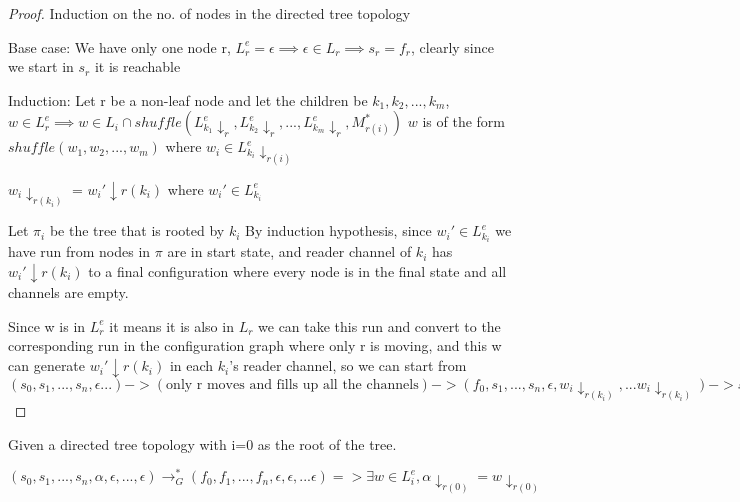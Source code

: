 \documentclass[a4paper,UKenglish,cleveref, autoref, thm-restate]{lipics-v2019}
\begin{document}
   
\begin{proof}
Induction on the no. of nodes in the directed tree topology

Base case: We have only one node r,  $L_r^e = {\epsilon} \implies \epsilon \in L_r \implies s_r = f_r$, clearly since we start in $s_r$ it is reachable

Induction: 
Let r be a non-leaf node and let the children be $k_1, k_2, ..., k_m$,  
$w \in L_r^e \implies w \in L_i \cap shuffle(L_{k_1}^e\!\!\!\downarrow_{r}, L_{k_2}^e\!\!\!\downarrow_{r}, ..., L_{k_m}^e\!\!\!\downarrow_{r}, M_{r(i)}^*)$
$w$ is of the form $shuffle(w_1, w_2, ..., w_m)$ where $w_i \in L_{k_i}^e\!\!\!\downarrow_{r(i)}$

$w_i\downarrow_{r(k_i)}$ = $w_i'\downarrow{r(k_i)}$ where $w_i' \in L_{k_i}^e$

Let $\pi_i$ be the tree that is rooted by $k_i$
By induction hypothesis, since $w_i' \in L_{k_i}^e$ we have run from nodes in $\pi$ are in start state, and reader channel of $k_i$ has $w_i'\downarrow{r(k_i)}$ 
to a final configuration where every node is in the final state and all channels are empty.

Since w is in $L_r^e$ it means it is also in $L_r$ we can take this run and convert to the corresponding run in the configuration graph where only r is moving, 
and this w can generate $w_i'\downarrow{r(k_i)}$ in each $k_i$'s reader channel, so we can start from $(s_0, s_1,...,s_n, \epsilon ...) -> (\text{only r moves and fills up all the channels}) -> (f_0, s_1, ..., s_n,\epsilon, w_i\downarrow_{r(k_i)}, ... w_i\downarrow_{r(k_i)} ) -> stitch the k_i run one after the other$ 

    
   \end{proof}
    
   

   
\begin{lemma}\label{testenv-lemma}
Given a directed tree topology with i=0 as the root of the tree.

$(s_0, s_1, ...,s_n, \alpha, \epsilon, ...,\epsilon) \rightarrow_G^* (f_0, f_1, ..., f_n, \epsilon, \epsilon, ... \epsilon) => \exists w \in L_i^e,   \alpha \downarrow_{r(0)} = w \downarrow_{r(0)}$

   \end{lemma}
   
\end{document}
